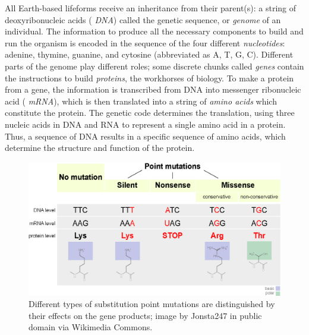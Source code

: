 \documentclass[
  letterpaper,
  DIV=11,
  numbers=noendperiod]{scrreprt}
\begin{document}
\label{sec:bio3}

All Earth-based lifeforms receive an inheritance from their parent(s): a
string of deoxyribonucleic acids ( \emph{DNA}) called the
genetic sequence, or  \emph{genome} of an individual. The
information to produce all the necessary components to build and run the
organism is encoded in the sequence of the four different
 \emph{nucleotides}: adenine, thymine, guanine, and
cytosine (abbreviated as A, T, G, C). Different parts of the genome play
different roles; some discrete chunks called \emph{genes} contain the
instructions to build  \emph{proteins}, the workhorses
of biology. To make a protein from a gene, the information is
transcribed from DNA into messenger ribonucleic acid (
\emph{mRNA}), which is then translated into a string of
 \emph{amino acids} which constitute the protein. The
genetic code determines the translation, using three nucleic acids in
DNA and RNA to represent a single amino acid in a protein. Thus, a
sequence of DNA results in a specific sequence of amino acids, which
determine the structure and function of the protein.

\begin{figure}

{\centering \includegraphics{./ch3/Point_mutations-en.png}

}

\caption{Different types of substitution 
point mutations are distinguished by their effects on the gene products;
image by Jonsta247 in public domain via Wikimedia Commons.}

\end{figure}
\end{document}
